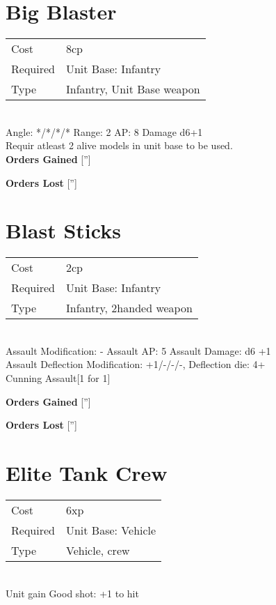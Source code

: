 






\pagebreak\section{ Big Blaster }

\begin{tabular}{ll}
    Cost & 8cp \\
    Required & Unit Base: Infantry\\
    Type & Infantry, Unit Base weapon\\
\end{tabular}
\ \\
\indent Angle: */*/*/* Range: 2  AP: 8 Damage d6+1 \\
Requir atleast 2 alive models in unit base to be used.
\ \\

{\bf Orders Gained}
['']

{\bf Orders Lost}
['']
\section{ Blast Sticks }

\begin{tabular}{ll}
    Cost & 2cp \\
    Required & Unit Base: Infantry\\
    Type & Infantry, 2handed weapon\\
\end{tabular}
\ \\
Assault Modification: - Assault AP: 5 Assault Damage: d6 +1\\
Assault Deflection Modification: +1/-/-/-, Deflection die: 4+ \\
Cunning Assault[1 for 1]



{\bf Orders Gained}
['']

{\bf Orders Lost}
['']
\section{ Elite Tank Crew }

\begin{tabular}{ll}
    Cost & 6xp \\
    Required & Unit Base: Vehicle\\
    Type & Vehicle, crew\\
\end{tabular}
\ \\
Unit gain Good shot: +1 to hit \\

